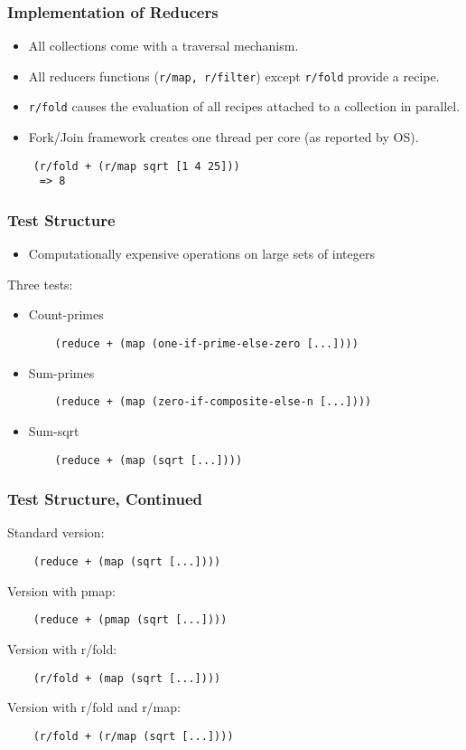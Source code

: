 \documentclass{beamer}
\newcommand{\clocode}[1]{{\texttt {#1}}}
\begin{document}
\begin{frame}[fragile]
\frametitle{Implementation of Reducers}
	\begin{itemize}
	\item All collections come with a traversal mechanism.
	\item All reducers functions (\clocode{r/map, r/filter}) except \clocode{r/fold} provide a recipe.
	\item \clocode{r/fold} causes the evaluation of all recipes attached to a collection in parallel.
	\item Fork/Join framework creates one thread per core (as reported by OS).
	\end{itemize}
	\begin{verbatim}
	(r/fold + (r/map sqrt [1 4 25]))
	 => 8
	\end{verbatim}
\end{frame}
\begin{frame}[fragile]
\frametitle{Test Structure}
	\begin{itemize}
	\item Computationally expensive operations on large sets of integers
	\end{itemize}
	Three tests:
	\begin{itemize}
	\item Count-primes
	\begin{verbatim}
	(reduce + (map (one-if-prime-else-zero [...])))
	\end{verbatim}
	\item Sum-primes
	\begin{verbatim}
	(reduce + (map (zero-if-composite-else-n [...])))
	\end{verbatim}
	\item Sum-sqrt
	\begin{verbatim}
	(reduce + (map (sqrt [...])))
	\end{verbatim}
	\end{itemize}
\end{frame}
\begin{frame}[fragile]
\frametitle{Test Structure, Continued}
	Standard version:
	\begin{verbatim}
	(reduce + (map (sqrt [...])))
	\end{verbatim}
	Version with pmap:
	\begin{verbatim}
	(reduce + (pmap (sqrt [...])))
	\end{verbatim}
	Version with r/fold:
	\begin{verbatim}
	(r/fold + (map (sqrt [...])))
	\end{verbatim}
	Version with r/fold and r/map:
	\begin{verbatim}
	(r/fold + (r/map (sqrt [...])))
	\end{verbatim}
\end{frame}
\end{document}
